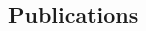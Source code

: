 \documentclass[12pt,a4paper,oneside,openright]{book}
\newcommand{\sct}[1]{Section~\ref{cha:#1}}
\newcommand{\lst}[1]{Listing~\ref{lst:#1}}
\newcommand{\removed}[1]{\cbstart\removedfragile{#1}\cbend{}}
\newcommand{\removedfragile}[1]{{\color{red}{\sout{#1}}}{}}
\newcommand{\removed}[1]{}
\newcommand{\removedfragile}[1]{}
\begin{document}
\begin{CJK}{UTF8}{}



\onehalfspacing

\chapter*{Publications}

\end{CJK}
\end{document}
